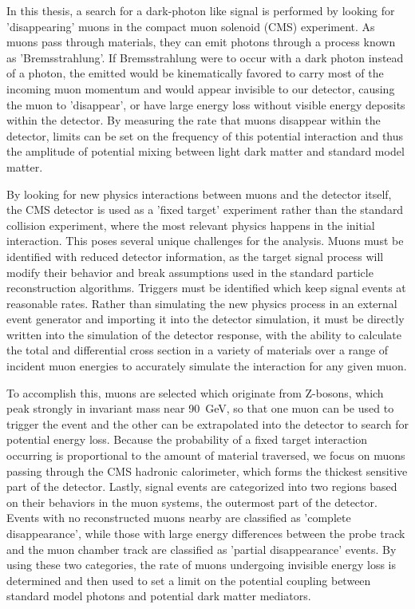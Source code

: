 In this thesis, a search for a dark-photon like signal is performed by looking for 'disappearing' muons in the compact muon solenoid (CMS) experiment. 
As muons pass through materials, they can emit photons through a process known as 'Bremsstrahlung'. 
If Bremsstrahlung were to occur with a dark photon instead of a photon, the emitted \aprime would be kinematically favored to carry most of the incoming muon momentum and would appear invisible to our detector, causing the muon to 'disappear', or have large energy loss without visible energy deposits within the detector.
By measuring the rate that muons disappear within the detector, limits can be set on the frequency of this potential interaction and thus the amplitude of potential mixing between light dark matter and standard model matter.

By looking for new physics interactions between muons and the detector itself, the CMS detector is used as a 'fixed target' experiment rather than the standard collision experiment, where the most relevant physics happens in the initial interaction.
This poses several unique challenges for the analysis.
Muons must be identified with reduced detector information, as the target signal process will modify their behavior and break assumptions used in the standard particle reconstruction algorithms.
Triggers must be identified which keep signal events at reasonable rates.
Rather than simulating the new physics process in an external event generator and importing it into the detector simulation, it must be directly written into the simulation of the detector response, with the ability to calculate the total and differential cross section in a variety of materials over a range of incident muon energies to accurately simulate the interaction for any given muon.

To accomplish this, muons are selected which originate from Z-bosons, which peak strongly in invariant mass near \SI{90}{\giga\eV}, so that one muon can be used to trigger the event and the other can be extrapolated into the detector to search for potential energy loss.
Because the probability of a fixed target interaction occurring is proportional to the amount of material traversed, we focus on muons passing through the CMS hadronic calorimeter, which forms the thickest sensitive part of the detector.
Lastly, signal events are categorized into two regions based on their behaviors in the muon systems, the outermost part of the detector. 
Events with no reconstructed muons nearby are classified as 'complete disappearance', while those with large energy differences between the probe track and the muon chamber track are classified as 'partial disappearance' events.
By using these two categories, the rate of muons undergoing invisible energy loss is determined and then used to set a limit on the potential coupling between standard model photons and potential dark matter mediators.

